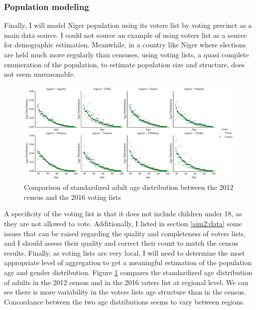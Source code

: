 \subsubsection{Population modeling}

Finally, I will model Niger population using its voters list by voting precinct as a main data source. I could not source an example of using voters list as a source for demographic estimation. Meanwhile, in a country like Niger where elections are held much more regularly than censuses, using voting lists, a quasi complete enumeration of the population, to estimate population size and structure, does not seem unreasonable.

\begin{figure}[ht]
	\begin{center}
		\includegraphics[width=\textwidth]{figure/age_structure_comparison.pdf}
		\caption{Comparison of standardized adult age distribution between the 2012 census and the 2016 voting lists}
		\label{fig:age_comparison}
	\end{center}
\end{figure}

A specificity of the voting list is that it does not include children under 18, as they are not allowed to vote. Additionally, I listed in section \ref{aim2:data} some issues that can be raised regarding the quality and completeness of voters lists, and I should assess their quality and correct their count to match the census results. Finally, as voting lists are very local, I will need to determine the most appropriate level of aggregation to get a meaningful estimation of the population age and gender distribution. Figure \ref{fig:age_comparison} compares the standardized age distribution of adults in the 2012 census and in the 2016 voters list at regional level. We can see there is more variability in the voters lists age structure than in the census. Concordance between the two age distributions seems to vary between regions.

